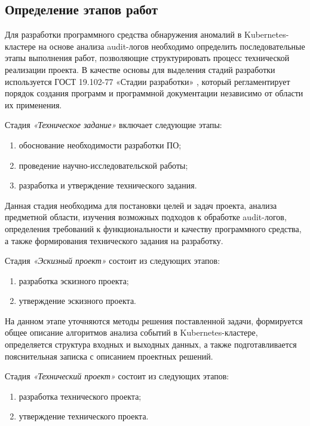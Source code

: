 \subsection{Определение этапов работ}

Для разработки программного средства обнаружения аномалий в Kubernetes-кластере на основе анализа audit-логов необходимо определить последовательные этапы выполнения работ, позволяющие структурировать процесс технической реализации проекта. В качестве основы для выделения стадий разработки используется ГОСТ 19.102-77 «Стадии разработки» \cite{gost_19_102_77}, который регламентирует порядок создания программ и программной документации независимо от области их применения.

Стадия \textit{«Техническое задание»} включает следующие этапы:
\begin{enumerate}
    \item обоснование необходимости разработки ПО;
    \item проведение научно-исследовательской работы;
    \item разработка и утверждение технического задания.
\end{enumerate}

Данная стадия необходима для постановки целей и задач проекта, анализа предметной области, изучения возможных подходов к обработке audit-логов, определения требований к функциональности и качеству программного средства, а также формирования технического задания на разработку.

Стадия \textit{«Эскизный проект»} состоит из следующих этапов:
\begin{enumerate}
    \item разработка эскизного проекта;
    \item утверждение эскизного проекта.
\end{enumerate}

На данном этапе уточняются методы решения поставленной задачи, формируется общее описание алгоритмов анализа событий в Kubernetes-кластере, определяется структура входных и выходных данных, а также подготавливается пояснительная записка с описанием проектных решений.

Стадия \textit{«Технический проект»} состоит из следующих этапов:
\begin{enumerate}
    \item разработка технического проекта;
    \item утверждение технического проекта.
\end{enumerate}

